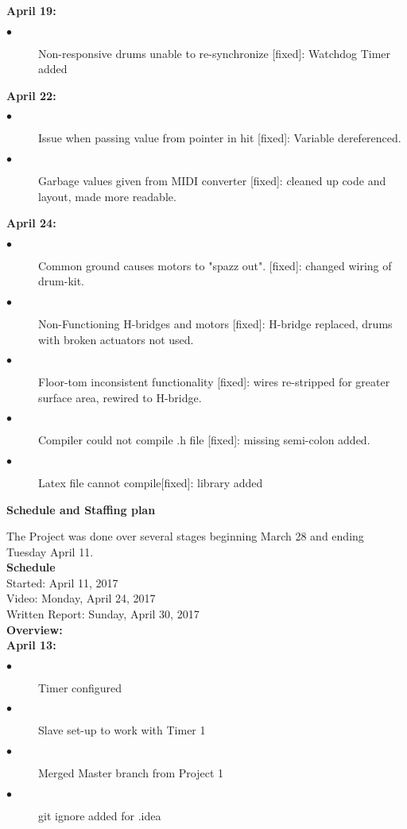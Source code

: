 \documentclass[]{report}
\begin{document}
\textbf{April 19:}
\begin{description}
	\item[$\bullet$] Non-responsive drums unable to re-synchronize [fixed]: Watchdog Timer added
\end{description}
\textbf{April 22:}
\begin{description}
	\item[$\bullet$] Issue when passing value from pointer in hit [fixed]: Variable dereferenced. 
	\item[$\bullet$] Garbage values given from MIDI converter [fixed]: cleaned up code and layout, made more readable.
\end{description}
\textbf{April 24:} 
\begin{description}
	\item[$\bullet$] Common ground causes motors to "spazz out". [fixed]: changed wiring of drum-kit.
	\item[$\bullet$] Non-Functioning H-bridges and motors [fixed]: H-bridge replaced, drums with broken actuators not used.
	\item[$\bullet$] Floor-tom inconsistent functionality [fixed]: wires re-stripped for greater surface area, rewired to H-bridge.
	\item[$\bullet$] Compiler could not compile .h file [fixed]: missing semi-colon added.
	\item[$\bullet$] Latex file cannot compile[fixed]: library added
\end{description}
	
\begin{center} \textbf{ Schedule
		and Staffing plan} \end{center}
	The Project was done over several stages beginning March 28 and ending Tuesday April 11.\\
	\textbf{Schedule}\\
	\indent Started: April 11, 2017\\
	\indent Video: Monday, April 24, 2017\\
	\indent Written Report: Sunday, April 30, 2017\\
	\textbf{Overview:}\\
	
\textbf{April 13:}
	\begin{description}
		\item[$\bullet$] Timer configured
		\item[$\bullet$] Slave set-up to work with Timer 1
		\item[$\bullet$] Merged Master branch from Project 1
		\item[$\bullet$] git ignore added for .idea
	\end{description}
	
\end{document}
